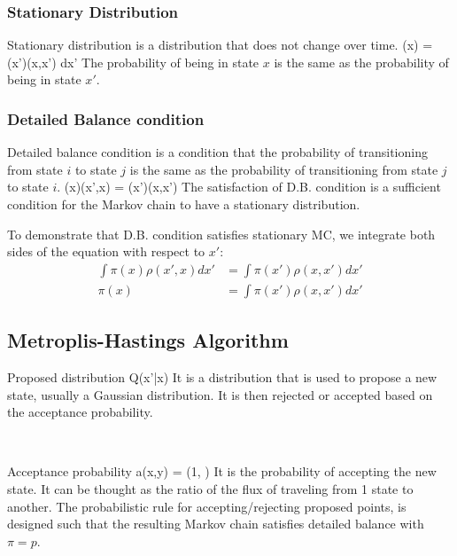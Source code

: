 \documentclass[12pt,a4paper]{article}
\begin{document}
\subsubsection{Stationary Distribution}
\begin{definition}
    {Stationary distribution is a distribution that does not change over time.}
    {\pi(x) = \int \pi(x')\rho(x,x') dx'}
    {The probability of being in state $x$ is the same as the probability of being in state $x'$.}
\end{definition}
\subsubsection{Detailed Balance condition}
\begin{definition}
    {Detailed balance condition is a condition that the probability of transitioning from state $i$ to state $j$ is the same as the probability of transitioning from state $j$ to state $i$.}
    {\pi(x)\rho(x',x) = \pi(x')\rho(x,x')}
    {The satisfaction of D.B. condition is a sufficient condition for the Markov chain to have a stationary distribution.}
\end{definition}
To demonstrate that D.B. condition satisfies stationary MC, we integrate both sides of the equation with respect to $x'$:
\begin{align*}
    \int \pi(x)\rho(x',x) dx' &= \int \pi(x')\rho(x,x') dx' \\
    \pi(x) &= \int \pi(x')\rho(x,x') dx'
\end{align*}


\subsection{Metroplis-Hastings Algorithm}
\begin{definition}
    {Proposed distribution}
    {Q(x'|x)}
    {It is a distribution that is used to propose a new state, usually a Gaussian distribution. It is then rejected or accepted based on the acceptance probability.}
\end{definition}
\\
\begin{definition}
    {Acceptance probability}
    {a(x,y) = \min\left(1, \right)}
    {It is the probability of accepting the new state. It can be thought as the ratio of the flux of traveling from 1 state to another.
    The probabilistic rule for accepting/rejecting proposed points, is designed such that the resulting Markov chain satisfies detailed balance with $\pi = p$.}
\end{definition}
\end{document}
